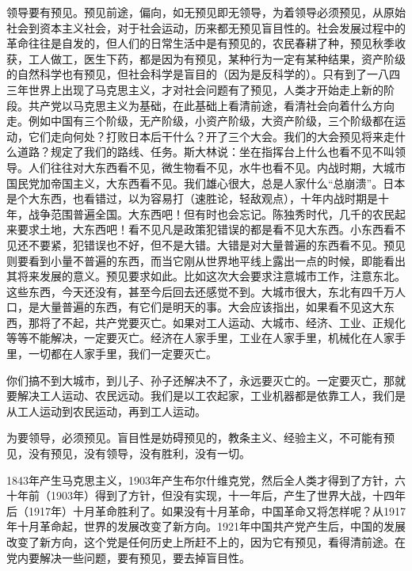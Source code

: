 领导要有预见。预见前途，偏向，如无预见即无领导，为着领导必须预见，从原始社会到资本主义社会，对于社会运动，历来都无预见盲目性的。社会发展过程中的革命往往是自发的，但人们的日常生活中是有预见的，农民春耕了种，预见秋季收获，工人做工，医生下药，都是因为有预见，某种行为一定有某种结果，资产阶级的自然科学也有预见，但社会科学是盲目的（因为是反科学的）。只有到了一八四三年世界上出现了马克思主义，才对社会问题有了预见，人类才开始走上新的阶段。共产党以马克思主义为基础，在此基础上看清前途，看清社会向着什么方向走。例如中国有三个阶级，无产阶级，小资产阶级，大资产阶级，三个阶级都在运动，它们走向何处？打败日本后干什么？开了三个大会。我们的大会预见将来走什么道路？规定了我们的路线、任务。斯大林说：坐在指挥台上什么也看不见不叫领导。人们往往对大东西看不见，微生物看不见，水牛也看不见。内战时期，大城市国民党加帝国主义，大东西看不见。我们雄心很大，总是人家什么“总崩溃”。日本是个大东西，也看错过，以为容易打（速胜论，轻敌观点），十年内战时期是十年，战争范围普遍全国。大东西吧！但有时也会忘记。陈独秀时代，几千的农民起来要求土地，大东西吧！看不见凡是政策犯错误的都是看不见大东西。小东西看不见还不要紧，犯错误也不好，但不是大错。大错是对大量普遍的东西看不见。预见则要看到小量不普遍的东西，而当它刚从世界地平线上露出一点的时候，即能看出其将来发展的意义。预见要求如此。比如这次大会要求注意城市工作，注意东北。这些东西，今天还没有，甚至今后回去还感觉不到。大城市很大，东北有四千万人口，是大量普遍的东西，有它们是明天的事。大会应该指出，如果看不见这大东西，那将了不起，共产党要灭亡。如果对工人运动、大城市、经济、工业、正规化等等不能解决，一定要灭亡。经济在人家手里，工业在人家手里，机械化在人家手里，一切都在人家手里，我们一定要灭亡。

你们搞不到大城市，到儿子、孙子还解决不了，永远要灭亡的。一定要灭亡，那就要解决工人运动、农民远动。我们是以工农起家，工业机器都是依靠工人，我们是从工人运动到农民运动，再到工人运动。

为要领导，必须预见。盲目性是妨碍预见的，教条主义、经验主义，不可能有预见，没有预见，没有领导，没有胜利，没有一切。

1843年产生马克思主义，1903年产生布尔什维克党，然后全人类才得到了方针，六十年前（1903年）得到了方针，但没有实现，十一年后，产生了世界大战，十四年后（1917年）十月革命胜利了。如果没有十月革命，中国革命又将怎样呢？从1917年十月革命起，世界的发展改变了新方向。1921年中国共产党产生后，中国的发展改变了新方向，这个党是任何历史上所赶不上的，因为它有预见，看得清前途。在党内要解决一些问题，要有预见，要去掉盲目性。

